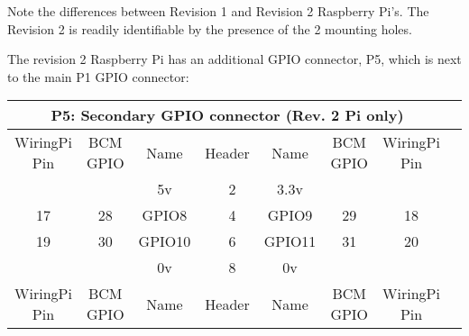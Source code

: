 \documentclass[12pt,a4paper]{article}
\begin{document}
\begin{sffamily}
Note the differences between Revision 1 and Revision 2 Raspberry
Pi's. The Revision 2 is readily identifiable by the presence of the 2
mounting holes.

The revision 2 Raspberry Pi has an additional GPIO connector, P5, which is next to the main P1 GPIO
connector:

\begin{center}
\begin{tabular}{|c|c|c||p{8mm}|p{8mm}||c|c|c|c|}
\hline
\multicolumn{8}{|c|}{\bfseries{P5: Secondary GPIO connector (Rev. 2 Pi only)}}\\
\hline
\hline
WiringPi Pin	& BCM GPIO	& Name	& \multicolumn{2}{|c||}{Header}	& Name	& BCM GPIO	& WiringPi Pin\\
\hline
\hline
	& 		& \textcolor{rtb-maroon}{5v}	& \raggedleft{1} &  2 & \textcolor{rtb-red}{3.3v}	& 	&	\\
\hline
17	& 28		& \textcolor{rtb-green}{GPIO8}	& \raggedleft{3} &  4 & \textcolor{rtb-green}{GPIO9}	& 29	& 18	\\
\hline
19	& 30		& \textcolor{rtb-green}{GPIO10}	& \raggedleft{5} &  6 & \textcolor{rtb-green}{GPIO11}	& 31	& 20	\\
\hline
	& 		& \textcolor{rtb-black}{0v}	& \raggedleft{7} &  8 & \textcolor{rtb-black}{0v}	& 	&	\\
\hline
\hline
WiringPi Pin	& BCM GPIO	& Name	& \multicolumn{2}{|c||}{Header}	& Name	& BCM GPIO	& WiringPi Pin\\
\hline
\end{tabular}
\end{center}


\end{sffamily}
\end{document}
